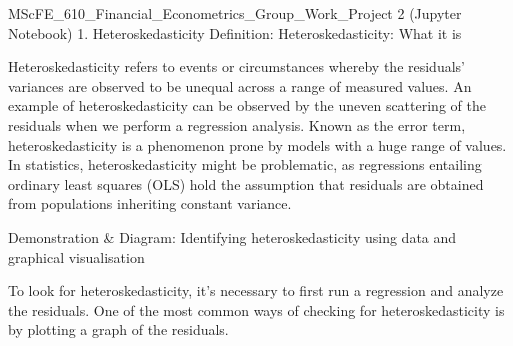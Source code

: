 MScFE_610_Financial_Econometrics_Group_Work_Project 2 (Jupyter Notebook)
1. Heteroskedasticity
Definition: Heteroskedasticity: What it is

Heteroskedasticity refers to events or circumstances whereby the residuals' variances are observed to be unequal across a range of measured values. An example of heteroskedasticity can be observed by the uneven scattering of the residuals when we perform a regression analysis. Known as the error term, heteroskedasticity is a phenomenon prone by models with a huge range of values. In statistics, heteroskedasticity might be problematic, as regressions entailing ordinary least squares (OLS) hold the assumption that residuals are obtained from populations inheriting constant variance.

Demonstration & Diagram: Identifying heteroskedasticity using data and graphical visualisation

To look for heteroskedasticity, it’s necessary to first run a regression and analyze the residuals. One of the most common ways of checking for heteroskedasticity is by plotting a graph of the residuals.

